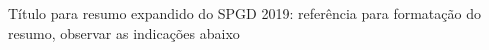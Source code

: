 \documentclass[a4paper,11pt,oneside,onecolumn,final]{article}
\begin{document}
\setlength{\parindent}{0pt} %

   
\Huge Título para resumo expandido do SPGD 2019: referência para formatação do resumo, observar as indicações abaixo

\vspace{10mm} %




\renewcommand{\baselinestretch}{1.15} %
\normalsize
\end{document}
